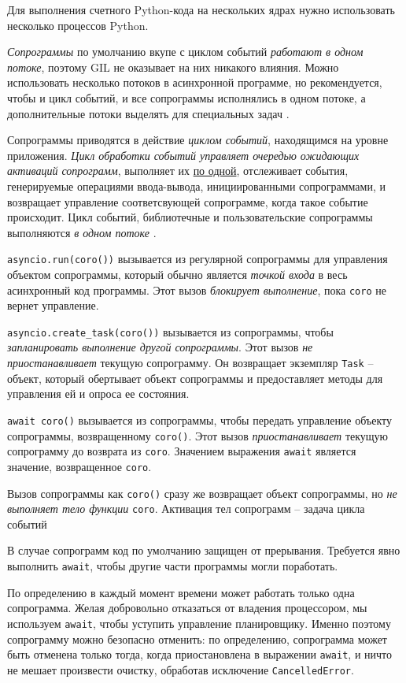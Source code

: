 \documentclass[%
	11pt,
	a4paper,
	utf8,
		]{article}
\begin{document}
Для выполнения счетного Python-кода на нескольких ядрах нужно использовать несколько процессов Python.

\emph{Сопрограммы} по умолчанию вкупе с циклом событий \emph{работают в одном потоке}, поэтому GIL не оказывает на них никакого влияния. Можно использовать несколько потоков в асинхронной программе, но рекомендуется, чтобы и цикл событий, и все сопрограммы исполнялись в одном потоке, а дополнительные потоки выделять для специальных задач \cite[]{ramalho:python-2022}.

Сопрограммы приводятся в действие \emph{циклом событий}, находящимся на уровне приложения. \emph{\color{blue}Цикл обработки событий управляет очередью ожидающих активаций сопрограмм}, выполняет их \underline{по одной}, отслеживает события, генерируемые операциями ввода-вывода, инициированными сопрограммами, и возвращает управление соответсвующей сопрограмме, когда такое событие происходит. Цикл событий, библиотечные и пользовательские сопрограммы выполняются \emph{в одном потоке} \cite[]{ramalho:python-2022}.

\verb|asyncio.run(coro())| вызывается из регулярной сопрограммы для управления объектом сопрограммы, который обычно является \emph{точкой входа} в весь асинхронный код программы. Этот вызов \emph{блокирует выполнение}, пока \verb*|coro| не вернет управление. 

\verb|asyncio.create_task(coro())| вызывается из сопрограммы, чтобы \emph{запланировать выполнение другой сопрограммы}. Этот вызов \emph{не приостанавливает} текущую сопрограмму. Он возвращает экземпляр \verb*|Task| -- объект, который обертывает объект сопрограммы и предоставляет методы для управления ей и опроса ее состояния.

\verb|await coro()| вызывается из сопрограммы, чтобы передать управление объекту сопрограммы, возвращенному \verb*|coro()|. Этот вызов \emph{приостанавливает} текущую сопрограмму до возврата из \verb|coro|. Значением выражения \verb*|await| является значение, возвращенное \verb|coro|.

{\color{red}
Вызов сопрограммы как \verb*|coro()| сразу же возвращает объект сопрограммы, но \emph{не выполняет тело функции} \verb|coro|. Активация тел сопрограмм -- задача цикла событий
}

В случае сопрограмм код по умолчанию защищен от прерывания. Требуется явно выполнить \verb*|await|, чтобы другие части программы могли поработать.

По определению в каждый момент времени может работать только одна сопрограмма. Желая добровольно отказаться от владения процессором, мы используем \verb|await|, чтобы уступить управление планировщику. Именно поэтому сопрограмму можно безопасно отменить: по определению, сопрограмма может быть отменена только тогда, когда приостановлена в выражении \verb*|await|, и ничто не мешает произвести очистку, обработав исключение \verb|CancelledError|.
\end{document}
